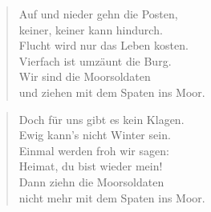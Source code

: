 \documentclass[9pt,a4paper,oneside, onecolumn]{article}
\begin{document}
\begin{verse}
Auf und nieder gehn die Posten,\\
keiner, keiner kann hindurch.\\
Flucht wird nur das Leben kosten.\\
Vierfach ist umzäunt die Burg.\\
Wir sind die Moorsoldaten\\
und ziehen mit dem Spaten ins Moor.\\
\end{verse}

\begin{verse}
Doch für uns gibt es kein Klagen.\\
Ewig kann's nicht Winter sein.\\
Einmal werden froh wir sagen:\\
Heimat, du bist wieder mein!\\
Dann ziehn die Moorsoldaten\\
nicht mehr mit dem Spaten ins Moor.\\
\end{verse}
\end{document}
